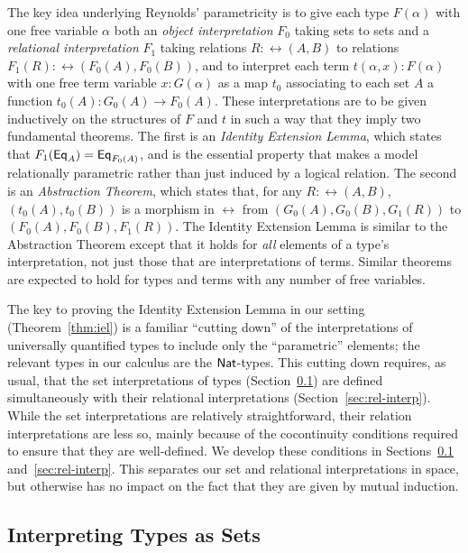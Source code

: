 \documentclass{lmcs}
\theoremstyle{plain}\newtheorem{satz}[thm]{Satz}
\begin{document}
The key idea underlying Reynolds' parametricity is to give each type
$F(\alpha)$ with one free variable $\alpha$ both an {\em object
  interpretation} $F_0$ taking sets to sets and a \emph{relational
  interpretation} $F_1$ taking relations $R : \rel(A,B)$ to relations
$F_1 (R) : \rel(F_0 (A), F_0 (B))$, and to interpret each term
$t(\alpha,x) : F(\alpha)$ with one free term variable $x : G(\alpha)$
as a map $t_0$ associating to each set $A$ a function $t_0(A) : G_0(A)
\to F_0(A)$. These interpretations are to be given inductively on the
structures of $F$ and $t$ in such a way that they imply two
fundamental theorems. The first is an \emph{Identity Extension Lemma},
which states that $F_1(\mathsf{Eq}_A) = \mathsf{Eq}_{F_0(A)}$, and is the essential
property that makes a model relationally parametric rather than just
induced by a logical relation. The second is an \emph{Abstraction
  Theorem}, which states that, for any $R :\rel(A, B)$,
$(t_0(A),t_0(B))$ is a morphism in $\rel$ from
$(G_0(A),G_0(B),G_1(R))$ to $(F_0(A),F_0(B),F_1(R))$. The Identity
Extension Lemma is similar to the Abstraction Theorem except that it
holds for {\em all} elements of a type's interpretation, not just
those that are interpretations of terms. Similar theorems are
expected to hold for types and terms with any number of free
variables.

The key to proving the Identity Extension Lemma in our setting
(Theorem~\ref{thm:iel}) is a familiar ``cutting down'' of the
interpretations of universally quantified types to include only the
``parametric'' elements; the relevant types in our calculus are the
$\mathsf{Nat}$-types.  This cutting down requires, as usual, that the set
interpretations of types (Section~\ref{sec:set-interp}) are defined
simultaneously with their relational interpretations
(Section~\ref{sec:rel-interp}). While the set interpretations are
relatively straightforward, their relation interpretations are less
so, mainly because of the cocontinuity conditions required to ensure
that they are well-defined. We develop these conditions in
Sections~\ref{sec:set-interp} and~\ref{sec:rel-interp}. This separates
our set and relational interpretations in space, but otherwise has no
impact on the fact that they are given by mutual induction.

\subsection{Interpreting Types as Sets}\label{sec:set-interp}
\end{document}
